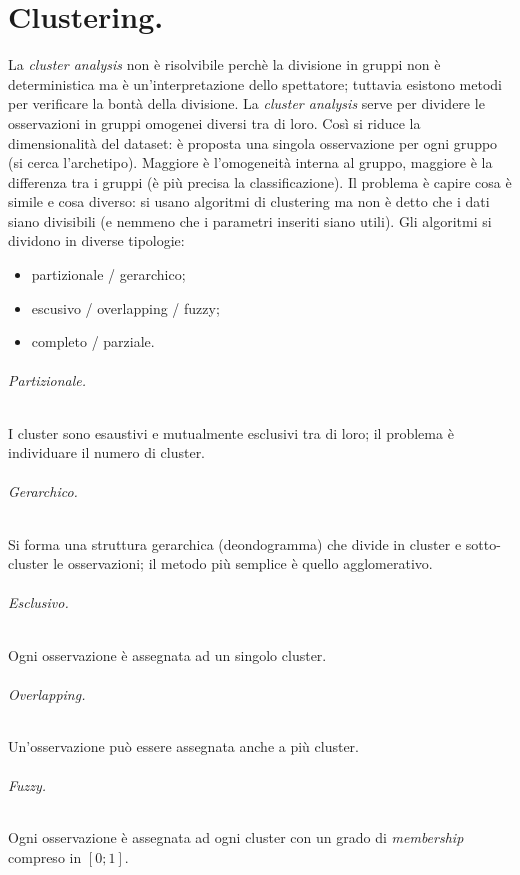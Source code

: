 \documentclass[11pt, a4page, twocolumn]{article}
\begin{document}
\newpage
\part{Clustering.}
La \textit{cluster analysis} non è risolvibile perchè la divisione in gruppi non è deterministica ma è un'interpretazione dello spettatore; tuttavia esistono metodi per verificare la bontà della divisione.
La \textit{cluster analysis} serve per dividere le osservazioni in gruppi omogenei diversi tra di loro.
Così si riduce la dimensionalità del dataset: è proposta una singola osservazione per ogni gruppo (si cerca l'archetipo).
Maggiore è l'omogeneità interna al gruppo, maggiore è la differenza tra i gruppi (è più precisa la classificazione). \newline
Il problema è capire cosa è simile e cosa diverso: si usano algoritmi di clustering ma non è detto che i dati siano divisibili (e nemmeno che i parametri inseriti siano utili).
Gli algoritmi si dividono in diverse tipologie:
\begin{itemize}
\item partizionale / gerarchico;
\item escusivo / overlapping / fuzzy;
\item completo / parziale.
\end{itemize}
\paragraph{Partizionale.}
I cluster sono esaustivi e mutualmente esclusivi tra di loro; il problema è individuare il numero di cluster.
\paragraph{Gerarchico.}
Si forma una struttura gerarchica (deondogramma) che divide in cluster e sotto-cluster le osservazioni; il metodo più semplice è quello agglomerativo.

\paragraph{Esclusivo.}
Ogni osservazione è assegnata ad un singolo cluster.
\paragraph{Overlapping.}
Un'osservazione può essere assegnata anche a più cluster.
\paragraph{Fuzzy.}
Ogni osservazione è assegnata ad ogni cluster con un grado di \textit{membership} compreso in $[0;1]$.
\end{document}
